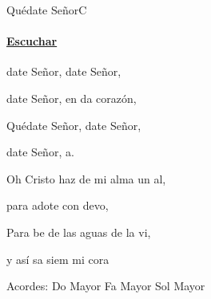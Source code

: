 \documentclass[12pt, spanish]{book}
\begin{document}
    \begin{song}{Quédate Señor}{C}
        {} %
        {}
        {} %
        {}
        \ifChordBk
        \paragraph{\mbox{}\hfill\protect\href{https://open.spotify.com/intl-es/track/1XPvafxrihkZn9gI4yWh8z}{Escuchar}\mbox{}\hfill}
        \fi

        \begin{SBOpGroup}
            date Señor, date Señor,

            date Señor, en da corazón,

            Quédate Señor, date Señor,

            date Señor, a.
        \end{SBOpGroup}

        \begin{SBChorus}
            Oh Cristo  haz de mi alma un al,

            para adote con devo,

            Para be de las aguas de la vi,

            y así sa siem mi cora
        \end{SBChorus}

        \ifChordBk
        \begin{SBOpGroup}
            Acordes:
            \upchord{\C}\qquad Do Mayor \hfill
            \upchord{\F}\qquad Fa Mayor \hfill\null\break
            \upchord{\G}\qquad Sol Mayor \hfill\null\break
        \end{SBOpGroup}
        \fi
    \end{song}
\end{document}
